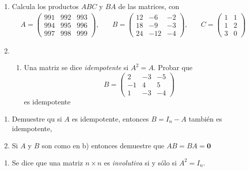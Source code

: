 \documentclass[
]{article}
\providecommand{\tightlist}{%
  \setlength{\itemsep}{0pt}\setlength{\parskip}{0pt}}
\begin{document}
\begin{enumerate}
\def\labelenumi{\arabic{enumi}.}
\item
  Calcula los productos \(ABC\) y \(BA\) de las matrices, con \[
  \begin{array}{lcr}
  A=\begin{pmatrix}
   991 & 992 & 993 \\
   994 & 995 & 996 \\
   997 & 998 & 999
    \end{pmatrix}, \quad &
  B = \begin{pmatrix}
   12 & -6 & -2 \\
   18 & -9 & -3 \\
   24 &-12 & -4
   \end{pmatrix}, \quad &
  C = \begin{pmatrix}
   1 & 1  \\
   1 & 2  \\
   3 & 0 
   \end{pmatrix}
  \end{array}
  \]
\item
  \begin{enumerate}
  \def\labelenumii{\alph{enumii})}
  \tightlist
  \item
    Una matriz se dice \emph{idempotente} si \(A^2 = A\). Probar que \[
    B= \begin{pmatrix}
     2 & -3 & -5 \\
    -1 &  4 & 5  \\
     1 & -3 &- 4
    \end{pmatrix}
    \] es idempotente
  \end{enumerate}
\end{enumerate}

\begin{enumerate}
\def\labelenumi{\alph{enumi})}
\setcounter{enumi}{1}
\tightlist
\item
  Demuestre qu si \(A\) es idempotente, entonces \(B=I_n-A\) también es
  idempotente,
\item
  Si \(A\) y \(B\) son como en b) entonces demuestre que
  \(AB= BA = \mathbf{0}\)
\end{enumerate}

\begin{enumerate}
\def\labelenumi{\arabic{enumi}.}
\tightlist
\item
  Se dice que una matriz \(n\times n\) es \emph{involutiva} si y sólo si
  \(A^2 = I_n\).
\end{enumerate}
\end{document}
